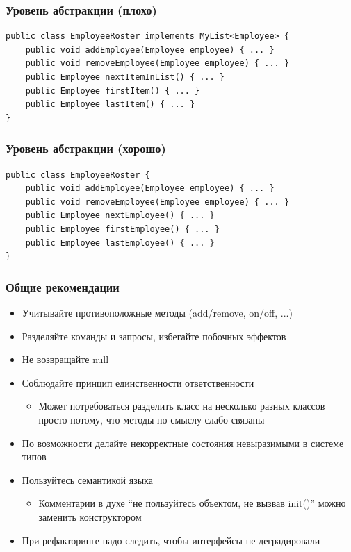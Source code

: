 \documentclass{../mcsslides}
\begin{document}
    \begin{frame}[fragile]
        \frametitle{Уровень абстракции (плохо)}
        \begin{verbatim}
public class EmployeeRoster implements MyList<Employee> {
    public void addEmployee(Employee employee) { ... }
    public void removeEmployee(Employee employee) { ... }
    public Employee nextItemInList() { ... }
    public Employee firstItem() { ... }
    public Employee lastItem() { ... }
}
        \end{verbatim}
    \end{frame}

    \begin{frame}[fragile]
        \frametitle{Уровень абстракции (хорошо)}
        \begin{verbatim}
public class EmployeeRoster {
    public void addEmployee(Employee employee) { ... }
    public void removeEmployee(Employee employee) { ... }
    public Employee nextEmployee() { ... }
    public Employee firstEmployee() { ... }
    public Employee lastEmployee() { ... }
}
        \end{verbatim}
    \end{frame}

    \begin{frame}
        \frametitle{Общие рекомендации}
        \begin{itemize}
            \item Учитывайте противоположные методы (add/remove, on/off, ...)
            \item Разделяйте команды и запросы, избегайте побочных эффектов
            \item Не возвращайте null
            \item Соблюдайте принцип единственности ответственности
            \begin{itemize}
                \item Может потребоваться разделить класс на несколько разных классов просто потому, что методы по смыслу слабо связаны
            \end{itemize}
            \item По возможности делайте некорректные состояния невыразимыми в системе типов
            \item Пользуйтесь семантикой языка
            \begin{itemize}
                \item Комментарии в духе ``не пользуйтесь объектом, не вызвав  init()'' можно заменить конструктором
            \end{itemize}
            \item При рефакторинге надо следить, чтобы интерфейсы не деградировали
        \end{itemize}
    \end{frame}
\end{document}
